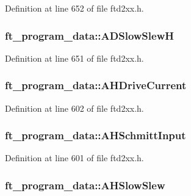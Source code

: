 Definition at line 652 of file ftd2xx.h.\hypertarget{structft__program__data_a315e8f813bdc38650a43cb1aa2076a58}{
\subsubsection[{ADSlowSlewH}]{ {\bf ft\_\-program\_\-data::ADSlowSlewH}}}
\label{structft__program__data_a315e8f813bdc38650a43cb1aa2076a58}


Definition at line 651 of file ftd2xx.h.\hypertarget{structft__program__data_add4068d542250349defc0ad9f6a51d3b}{
\subsubsection[{AHDriveCurrent}]{ {\bf ft\_\-program\_\-data::AHDriveCurrent}}}
\label{structft__program__data_add4068d542250349defc0ad9f6a51d3b}


Definition at line 602 of file ftd2xx.h.\hypertarget{structft__program__data_a6a6ae4b35632934297bc50385b18ddb1}{
\subsubsection[{AHSchmittInput}]{ {\bf ft\_\-program\_\-data::AHSchmittInput}}}
\label{structft__program__data_a6a6ae4b35632934297bc50385b18ddb1}


Definition at line 601 of file ftd2xx.h.\hypertarget{structft__program__data_a70b579cf3a9556b651411f760017b8f3}{
\subsubsection[{AHSlowSlew}]{ {\bf ft\_\-program\_\-data::AHSlowSlew}}}
\label{structft__program__data_a70b579cf3a9556b651411f760017b8f3}


